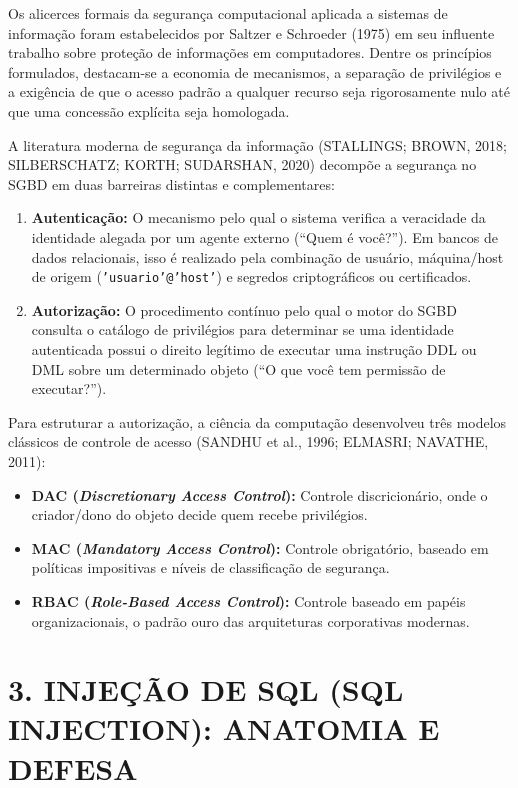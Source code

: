 Os alicerces formais da segurança computacional aplicada a sistemas de informação foram estabelecidos por Saltzer e Schroeder (1975) em seu influente trabalho sobre proteção de informações em computadores. Dentre os princípios formulados, destacam-se a economia de mecanismos, a separação de privilégios e a exigência de que o acesso padrão a qualquer recurso seja rigorosamente nulo até que uma concessão explícita seja homologada.

A literatura moderna de segurança da informação (STALLINGS; BROWN, 2018; SILBERSCHATZ; KORTH; SUDARSHAN, 2020) decompõe a segurança no SGBD em duas barreiras distintas e complementares:
\begin{enumerate}
    \item \textbf{Autenticação:} O mecanismo pelo qual o sistema verifica a veracidade da identidade alegada por um agente externo (``Quem é você?''). Em bancos de dados relacionais, isso é realizado pela combinação de usuário, máquina/host de origem (\texttt{'usuario'@'host'}) e segredos criptográficos ou certificados.
    \item \textbf{Autorização:} O procedimento contínuo pelo qual o motor do SGBD consulta o catálogo de privilégios para determinar se uma identidade autenticada possui o direito legítimo de executar uma instrução DDL ou DML sobre um determinado objeto (``O que você tem permissão de executar?'').
\end{enumerate}

Para estruturar a autorização, a ciência da computação desenvolveu três modelos clássicos de controle de acesso (SANDHU et al., 1996; ELMASRI; NAVATHE, 2011):
\begin{itemize}
    \item \textbf{DAC (\textit{Discretionary Access Control}):} Controle discricionário, onde o criador/dono do objeto decide quem recebe privilégios.
    \item \textbf{MAC (\textit{Mandatory Access Control}):} Controle obrigatório, baseado em políticas impositivas e níveis de classificação de segurança.
    \item \textbf{RBAC (\textit{Role-Based Access Control}):} Controle baseado em papéis organizacionais, o padrão ouro das arquiteturas corporativas modernas.
\end{itemize}

\newpage

\section*{3. INJEÇÃO DE SQL (SQL INJECTION): ANATOMIA E DEFESA}


